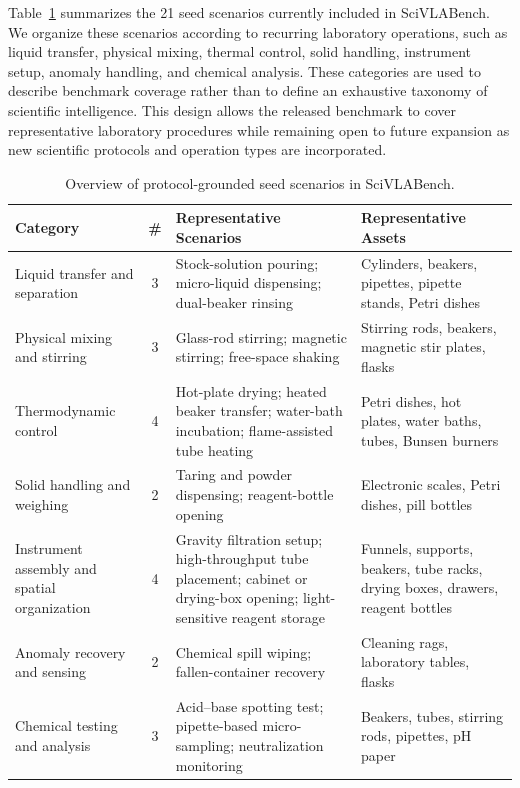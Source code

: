 Table~\ref{tab:seed-scenarios} summarizes the 21 seed scenarios currently included in SciVLABench. We organize these scenarios according to recurring laboratory operations, such as liquid transfer, physical mixing, thermal control, solid handling, instrument setup, anomaly handling, and chemical analysis. These categories are used to describe benchmark coverage rather than to define an exhaustive taxonomy of scientific intelligence. This design allows the released benchmark to cover representative laboratory procedures while remaining open to future expansion as new scientific protocols and operation types are incorporated.

\begin{table}[t]
  \centering
  \caption{Overview of protocol-grounded seed scenarios in SciVLABench.}
  \label{tab:seed-scenarios}
  \small
  \setlength{\tabcolsep}{5pt}
  \renewcommand{\arraystretch}{1.15}
  \begin{tabular}{p{3.4cm} c p{5.1cm} p{5.1cm}}
    \toprule
    \textbf{Category} & \textbf{\#} & \textbf{Representative Scenarios} & \textbf{Representative Assets} \\
    \midrule
    Liquid transfer and separation
    & 3
    & Stock-solution pouring; micro-liquid dispensing; dual-beaker rinsing
    & Cylinders, beakers, pipettes, pipette stands, Petri dishes \\

    Physical mixing and stirring
    & 3
    & Glass-rod stirring; magnetic stirring; free-space shaking
    & Stirring rods, beakers, magnetic stir plates, flasks \\

    Thermodynamic control
    & 4
    & Hot-plate drying; heated beaker transfer; water-bath incubation; flame-assisted tube heating
    & Petri dishes, hot plates, water baths, tubes, Bunsen burners \\

    Solid handling and weighing
    & 2
    & Taring and powder dispensing; reagent-bottle opening
    & Electronic scales, Petri dishes, pill bottles \\

    Instrument assembly and spatial organization
    & 4
    & Gravity filtration setup; high-throughput tube placement; cabinet or drying-box opening; light-sensitive reagent storage
    & Funnels, supports, beakers, tube racks, drying boxes, drawers, reagent bottles \\

    Anomaly recovery and sensing
    & 2
    & Chemical spill wiping; fallen-container recovery
    & Cleaning rags, laboratory tables, flasks \\

    Chemical testing and analysis
    & 3
    & Acid--base spotting test; pipette-based micro-sampling; neutralization monitoring
    & Beakers, tubes, stirring rods, pipettes, pH paper \\
    \bottomrule
  \end{tabular}
\end{table}

